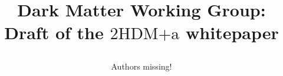 \documentclass[a4paper, 11pt,notoc]{article}
\newcommand{\hdma}{\ensuremath{\textrm{2HDM+a}}\xspace}
\begin{document}
\title{\begin{boldmath} \huge Dark Matter Working Group:  \\ Draft of the \hdma whitepaper \vspace{7mm} \end{boldmath}}





\author[]{Authors missing!}











\end{document}
